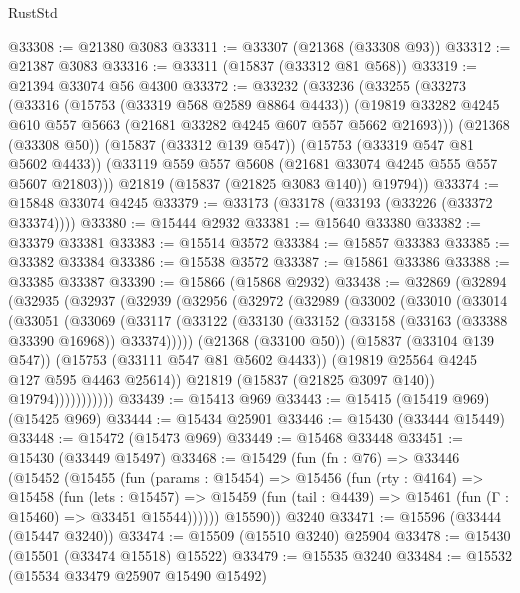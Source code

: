 \begin{lexlean}{RustStd}
\begin{coremodule}
@33308 := @21380 @3083
@33311 := @33307 (@21368 (@33308 @93))
@33312 := @21387 @3083
@33316 := @33311 (@15837 (@33312 @81 @568))
@33319 := @21394 @33074 @56 @4300
@33372 := @33232
    (@33236
      (@33255
        (@33273
          (@33316
            (@15753 (@33319 @568 @2589 @8864 @4433))
            (@19819 @33282 @4245 @610 @557 @5663 (@21681 @33282 @4245 @607 @557 @5662 @21693)))
          (@21368 (@33308 @50))
          (@15837 (@33312 @139 @547))
          (@15753 (@33319 @547 @81 @5602 @4433))
          (@33119 @559 @557 @5608 (@21681 @33074 @4245 @555 @557 @5607 @21803)))
        @21819
        (@15837 (@21825 @3083 @140))
        @19794))
@33374 := @15848 @33074 @4245
@33379 := @33173 (@33178 (@33193 (@33226 (@33372 @33374))))
@33380 := @15444 @2932
@33381 := @15640 @33380
@33382 := @33379 @33381
@33383 := @15514 @3572
@33384 := @15857 @33383
@33385 := @33382 @33384
@33386 := @15538 @3572
@33387 := @15861 @33386
@33388 := @33385 @33387
@33390 := @15866 (@15868 @2932)
@33438 := @32869
    (@32894
      (@32935
        (@32937
          (@32939
            (@32956
              (@32972
                (@32989
                  (@33002
                    (@33010
                      (@33014
                        (@33051
                          (@33069
                            (@33117
                              (@33122
                                (@33130 (@33152 (@33158 (@33163 (@33388 @33390 @16968)) @33374)))))
                            (@21368 (@33100 @50))
                            (@15837 (@33104 @139 @547))
                            (@15753 (@33111 @547 @81 @5602 @4433))
                            (@19819 @25564 @4245 @127 @595 @4463 @25614))
                          @21819
                          (@15837 (@21825 @3097 @140))
                          @19794)))))))))))
@33439 := @15413 @969
@33443 := @15415 (@15419 @969) (@15425 @969)
@33444 := @15434 @25901
@33446 := @15430 (@33444 @15449)
@33448 := @15472 (@15473 @969)
@33449 := @15468 @33448
@33451 := @15430 (@33449 @15497)
@33468 := @15429
    (fun (fn : @76) =>
    @33446
      (@15452
        (@15455
          (fun (params : @15454) =>
          @15456
            (fun (rty : @4164) =>
            @15458
              (fun (lets : @15457) =>
              @15459 (fun (tail : @4439) => @15461 (fun (Γ : @15460) => @33451 @15544))))))
        @15590))
    @3240
@33471 := @15596 (@33444 (@15447 @3240))
@33474 := @15509 (@15510 @3240) @25904
@33478 := @15430 (@15501 (@33474 @15518) @15522)
@33479 := @15535 @3240
@33484 := @15532 (@15534 @33479 @25907 @15490 @15492)

\end{coremodule}
\end{lexlean}
